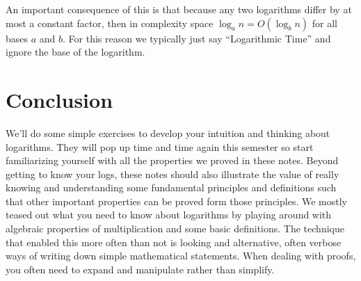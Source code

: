 \documentclass[nobib]{tufte-handout}
\begin{document}
An important consequence of this is that because any two logarithms differ by at most a constant factor, then in complexity space $\log_a{n} = O(\log_b{n})$ for all bases $a$ and $b$.  For this reason we typically just say ``Logarithmic Time'' and ignore the base of the logarithm.

\section{Conclusion}

We'll do some simple exercises to develop your intuition and thinking about logarithms. They will pop up time and time again this semester so start familiarizing yourself with all the properties we proved in these notes. Beyond getting to know your logs, these notes should also illustrate the value of really knowing and understanding some fundamental principles and definitions such that other important properties can be proved form those principles. We mostly teased out what you need to know about logarithms by playing around with algebraic properties of multiplication and some basic definitions. The technique that enabled this more often than not is looking and alternative, often verbose ways of writing down simple mathematical statements. When dealing with proofs, you often need to expand and manipulate rather than simplify.
\end{document}

